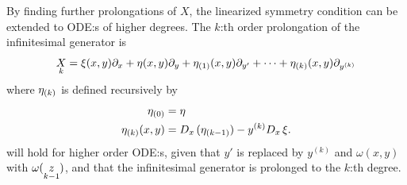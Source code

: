 By finding further prolongations of \(X\), the linearized symmetry condition can be extended to ODE:s of higher degrees.
The \(k\):th order prolongation of the infinitesimal generator is
\begin{equation*}
  \prolong{X}{k} = \xi(x,y) \partial_x + \eta(x,y) \partial_y + \prolongpart{\eta}{1}(x,y) \partial_{y'} + \dots + \prolongpart{\eta}{k}(x,y) \partial_{y^{(k)}}
\end{equation*}
where \(\prolongpart{\eta}{k}\) is defined recursively by
\begin{align*}
  \prolongpart{\eta}{0} &= \eta\\
  \prolongpart{\eta}{k}(x,y) &= \tD{x}(\prolongpart{\eta}{k-1}) - y^{(k)} \tD{x} \xi.
\end{align*}
 will hold for higher order ODE:s, given that \(y'\) is replaced by \(y^{(k)}\) and \(\omega(x,y)\) with \(\omega(\prolong{z}{k-1})\), and that the infinitesimal generator is prolonged to the \(k\):th degree.

